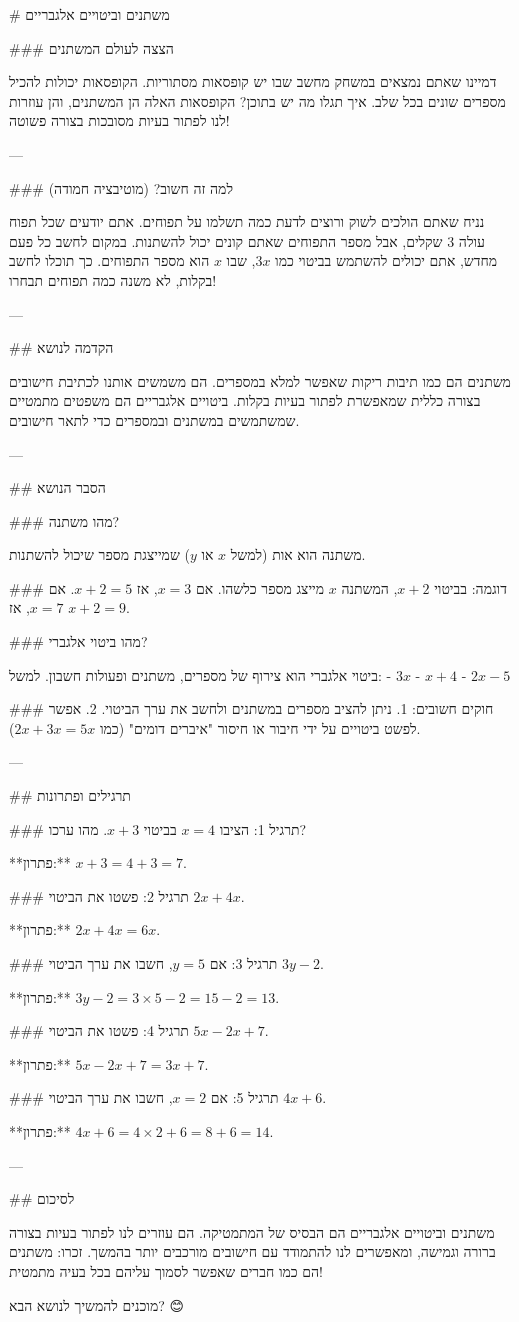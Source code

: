 # משתנים וביטויים אלגבריים

### הצצה לעולם המשתנים

דמיינו שאתם נמצאים במשחק מחשב שבו יש קופסאות מסתוריות. הקופסאות יכולות להכיל מספרים שונים בכל שלב. איך תגלו מה יש בתוכן? 
הקופסאות האלה הן המשתנים, והן עוזרות לנו לפתור בעיות מסובכות בצורה פשוטה!

---

### למה זה חשוב? (מוטיבציה חמודה)

נניח שאתם הולכים לשוק ורוצים לדעת כמה תשלמו על תפוחים. אתם יודעים שכל תפוח עולה 3 שקלים, אבל מספר התפוחים שאתם קונים יכול להשתנות. במקום לחשב כל פעם מחדש, אתם יכולים להשתמש בביטוי כמו $3x$, שבו $x$ הוא מספר התפוחים. כך תוכלו לחשב בקלות, לא משנה כמה תפוחים תבחרו!

---

## הקדמה לנושא

משתנים הם כמו תיבות ריקות שאפשר למלא במספרים. הם משמשים אותנו לכתיבת חישובים בצורה כללית שמאפשרת לפתור בעיות בקלות. ביטויים אלגבריים הם משפטים מתמטיים שמשתמשים במשתנים ובמספרים כדי לתאר חישובים.

---

## הסבר הנושא

### מהו משתנה?

משתנה הוא אות (למשל $x$ או $y$) שמייצגת מספר שיכול להשתנות.

### דוגמה:
בביטוי $x + 2$, המשתנה $x$ מייצג מספר כלשהו. אם $x = 3$, אז $x + 2 = 5$. אם $x = 7$, אז $x + 2 = 9$.

### מהו ביטוי אלגברי?

ביטוי אלגברי הוא צירוף של מספרים, משתנים ופעולות חשבון. למשל:
- $3x$
- $x + 4$
- $2x - 5$

### חוקים חשובים:
1. ניתן להציב מספרים במשתנים ולחשב את ערך הביטוי.
2. אפשר לפשט ביטויים על ידי חיבור או חיסור "איברים דומים" (כמו $2x + 3x = 5x$).

---

## תרגילים ופתרונות

### תרגיל 1:
הציבו $x = 4$ בביטוי $x + 3$. מהו ערכו?

**פתרון:** $x + 3 = 4 + 3 = 7$.

### תרגיל 2:
פשטו את הביטוי $2x + 4x$.

**פתרון:** $2x + 4x = 6x$.

### תרגיל 3:
אם $y = 5$, חשבו את ערך הביטוי $3y - 2$.

**פתרון:** $3y - 2 = 3 \times 5 - 2 = 15 - 2 = 13$.

### תרגיל 4:
פשטו את הביטוי $5x - 2x + 7$.

**פתרון:** $5x - 2x + 7 = 3x + 7$.

### תרגיל 5:
אם $x = 2$, חשבו את ערך הביטוי $4x + 6$.

**פתרון:** $4x + 6 = 4 \times 2 + 6 = 8 + 6 = 14$.

---

## לסיכום

משתנים וביטויים אלגבריים הם הבסיס של המתמטיקה. הם עוזרים לנו לפתור בעיות בצורה ברורה וגמישה, ומאפשרים לנו להתמודד עם חישובים מורכבים יותר בהמשך. זכרו: משתנים הם כמו חברים שאפשר לסמוך עליהם בכל בעיה מתמטית! 

מוכנים להמשיך לנושא הבא? 😊